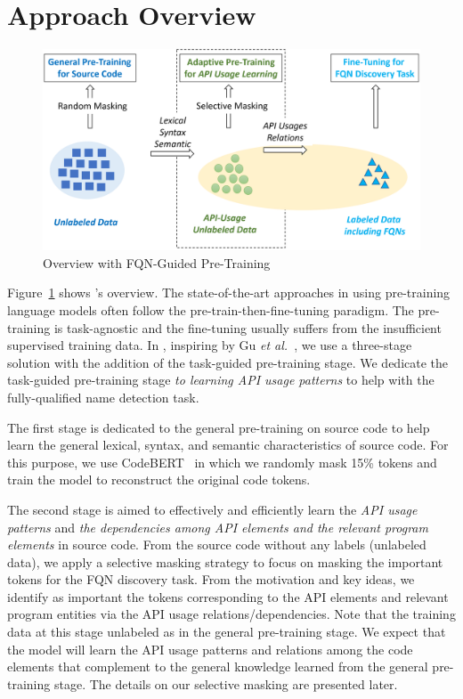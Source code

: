 \section{Approach Overview}
\label{sec:overview}

\begin{figure}[t] %
	\centering
	\includegraphics[width=\linewidth]{overview}
        \vspace{-12pt}
	\caption{{\tool} Overview with FQN-Guided Pre-Training}
	\label{fig:overview}
\end{figure}

Figure~\ref{fig:overview} shows {\tool}'s overview. The
state-of-the-art approaches in using pre-training language models
often follow the pre-train-then-fine-tuning paradigm. The pre-training
is task-agnostic and the fine-tuning usually suffers from the
insufficient supervised training data. In {\tool}, inspiring by Gu
{\em et al.}~\cite{gu-emnlp20}, we use a three-stage solution with the
addition of the task-guided pre-training stage. We dedicate the
task-guided pre-training stage {\em to learning API usage patterns} to
help with the fully-qualified name detection task.

The first stage is dedicated to the general pre-training on source
code to help {\tool} learn the general lexical, syntax, and semantic
characteristics of source code. For this purpose, we use
CodeBERT~\cite{codebert} in which we randomly mask 15\% tokens and
train the model to reconstruct the original code tokens.

The second stage is aimed to effectively and efficiently learn the
{\em API usage patterns} and {\em the dependencies among API elements
  and the relevant program elements} in source code. From the source
code without any labels (unlabeled data), we apply a selective masking
strategy to focus on masking the important tokens for the FQN
discovery task. From the motivation and key ideas, we identify as
important the tokens corresponding to the API elements and relevant
program entities via the API usage relations/dependencies. Note that
the training data at this stage unlabeled as in the general
pre-training stage. We expect that the model will learn the API usage
patterns and relations among the code elements that complement to the
general knowledge learned from the general pre-training stage. The
details on our selective masking are presented later.

